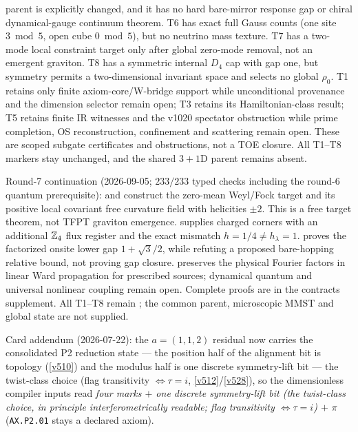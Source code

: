 parent is explicitly changed, and it has no hard bare-mirror response gap
or chiral dynamical-gauge continuum theorem. T6 has exact full Gauss counts
(one site $3\bmod5$, open cube $0\bmod5$), but no neutrino mass texture.
T7 has a two-mode local constraint target only after global zero-mode removal,
not an emergent graviton. T8 has a symmetric internal $D_4$ cap with gap one,
but symmetry permits a two-dimensional invariant space and selects no global
$\rho_0$. T1 retains only
finite axiom-core/W-bridge support while unconditional provenance and the dimension
selector remain open; T3 retains its Hamiltonian-class result; T5 retains finite IR
witnesses and the v1020 spectator obstruction while prime completion, OS reconstruction,
confinement and scattering remain open. These are scoped subgate certificates and
obstructions, not a TOE closure.  All T1--T8 markers stay unchanged, and the shared
$3{+}1$D parent remains absent.
\par\smallskip\noindent
Round-7 continuation (2026-09-05; $233/233$ typed checks including the
round-6 quantum prerequisite):
 and
 construct the zero-mean Weyl/Fock
target and its positive local covariant free curvature field with
helicities $\pm2$. This is a free target theorem, not TFPT graviton emergence.
 supplies charged corners with an
additional $\mathbb{Z}_4$ flux register and the exact mismatch $h=1/4\ne h_\lambda=1$.
 proves the factorized onsite lower gap
$1+\sqrt3/2$, while refuting a proposed bare-hopping relative bound, not
proving gap closure.  preserves the
physical Fourier factors in linear Ward propagation for prescribed sources;
dynamical quantum and universal nonlinear coupling remain open.
Complete proofs are in the contracts supplement. All T1--T8 remain \mO;
the common parent, microscopic MMST and global state are not supplied.
\par\smallskip
\noindent Card addendum (2026-07-22): the $a=(1,1,2)$ residual now carries the consolidated P2
reduction state --- the position half of the alignment bit is topology (\vref{v510}) and the modulus
half is one discrete symmetry-lift bit --- the twist-class choice (flag transitivity
$\iff\tau=i$, \vref{v512}/\vref{v528}), so the
dimensionless compiler inputs read \emph{four marks $+$ one discrete symmetry-lift bit (the
twist-class choice, in principle interferometrically readable; flag
transitivity $\iff\tau=i$) $+$ $\pi$}
(\texttt{AX.P2.01} stays a declared axiom).
